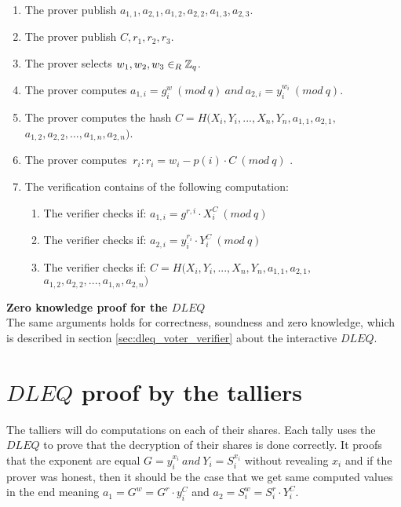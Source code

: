 \begin{enumerate}
    \item The prover publish $a_{1,1},a_{2,1},a_{1,2},a_{2,2},a_{1,3},a_{2,3}$.
    \item The prover publish $C,r_1,r_2,r_3$.
    \item The prover selects  $w_1, w_2,w_3\in_R \mathbb{Z}_q$.
    \item The prover computes $a_{1,i}=g^w_i \ (mod\ q) \ and \ a_{2,i}=y_i^{w_i} \ (mod\ q)$.
    \item The prover computes the hash  $C=H(X_i,Y_i,...,X_n,Y_n,a_{1,1},a_{2,1},$\\
$a_{1,2},a_{2,2},...,a_{1,n},a_{2,n})$.
    \item The prover computes $\ r_i:  r_i=w_i-p(i)  \cdot  C \ (mod\ q)$ .
    \item The verification contains of the following computation:
    \begin{enumerate}        
        \item The verifier checks if: $a_{1,i} = g^{r,i} \cdot X_i^C \ (mod\ q) $
        \item The verifier checks if: $a_{2,i} =y_i^{r_{i}}  \cdot  Y_i^C \ (mod\ q)  $ 
         \item The verifier checks if: $C=H(X_i,Y_i,...,X_n,Y_n,a_{1,1},a_{2,1},$\\
$a_{1,2},a_{2,2},...,a_{1,n},a_{2,n})$
    \end{enumerate}
\end{enumerate}



\noindent
\textbf{Zero knowledge proof for the $DLEQ$}\\
The same arguments holds for correctness, soundness and zero knowledge, which is described in section \ref{sec:dleq_voter_verifier} about the interactive $DLEQ$. 



\section{$DLEQ$ proof by the talliers}
\label{sec:dleq_proof_by_the_talliers}
The talliers will do computations on each of their shares. Each tally uses the $DLEQ$ to prove that the decryption of their shares is done correctly. It proofs that the exponent are equal \begin{math}G = y_i^{x_i}  \ and \ Y_i=S_i^{x_i} \end{math} without revealing \begin{math}x_i \end{math} and if the prover was honest, then it should be the case that we get same computed values in the end meaning \begin{math}a_1=G^w = G^r \cdot y_i^C\end{math} and \begin{math}a_2=S_i^w = S_i^r \cdot Y_i^C\end{math}.\\

